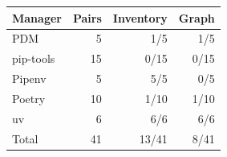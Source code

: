 \begin{tabular}{lrrr}
\toprule
Manager & Pairs & Inventory & Graph \\
\midrule
PDM & 5 & 1/5 & 1/5 \\
pip-tools & 15 & 0/15 & 0/15 \\
Pipenv & 5 & 5/5 & 0/5 \\
Poetry & 10 & 1/10 & 1/10 \\
uv & 6 & 6/6 & 6/6 \\
Total & 41 & 13/41 & 8/41 \\
\bottomrule
\end{tabular}
